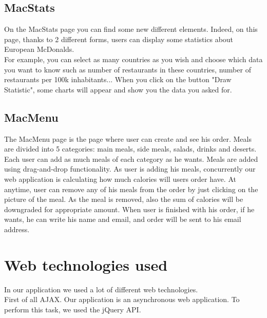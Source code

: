 \documentclass[12pt]{article}
\begin{document}
        \newpage

        {\color{color_subsection}\subsection{MacStats}}
        \noindent On the MacStats page you can find some new different elements.
        Indeed, on this page, thanks to 2 different forms, users can display
        some statistics about European McDonalds.\\

        \noindent For example, you can select as many countries as you wish
        and choose which data you want to know such as number of restaurants
        in these countries, number of restaurants per 100k inhabitants... When
        you click on the button "Draw  Statistic", some charts will appear and
        show you the data you asked for.\\
        {\color{color_subsection}\subsection{MacMenu}}
        \noindent The MacMenu page is the page where user can create and see his order.
         Meals are divided into 5 categories: main meals, side meals, salads, drinks 
         and deserts. Each user can add as much meals of each category as he wants. 
         Meals are added using drag-and-drop functionality. As user is adding his meals,
          concurrently our web application is calculating how much calories will users 
          order have. At anytime, user can remove any of his meals from the order by 
          just clicking on the picture of the meal. As the meal is removed, also the 
          sum of calories will be downgraded for appropriate amount. When user is 
          finished with his order, if he wants, he can write his name and email, and 
          order will be sent to his email address.\\

    {\color{color_section}\section{Web technologies used}}

    \noindent In our application we used a lot of different web technologies.\\

    \noindent First of all AJAX. Our application is an asynchronous web application.
    To perform this task, we used the jQuery API.\\
\end{document}
